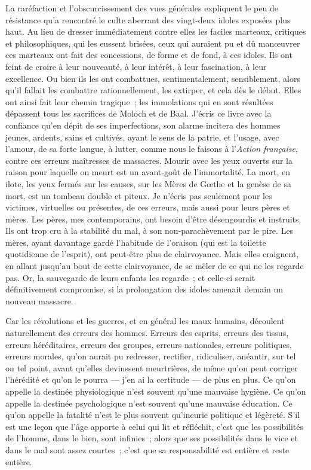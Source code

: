 \documentclass[french,twoside]{book} %
\begin{document}
La raréfaction et l’obscurcissement des vues générales expliquent le peu de résistance qu’a rencontré le culte aberrant des vingt-deux idoles exposées plus haut. Au lieu de dresser immédiatement contre elles les faciles marteaux, critiques et philosophiques, qui les eussent brisées, ceux qui auraient pu et dû manœuvrer ces marteaux ont fait des concessions, de forme et de fond, à ces idoles. Ils ont feint de croire à leur nouveauté, à leur intérêt, à leur fascination, à leur excellence. Ou bien ils les ont combattues, sentimentalement, sensiblement, alors qu’il fallait les combattre rationnellement, les extirper, et cela dès le début. Elles ont ainsi fait leur chemin tragique ; les immolations qui en sont résultées dépassent tous les sacrifices de Moloch et de Baal. J’écris ce livre avec la confiance qu’en dépit de ses imperfections, son alarme incitera des hommes jeunes, ardents, sains et cultivés, ayant le sens de la patrie, et l’usage, avec l’amour, de sa forte langue, à lutter, comme nous le faisons à l’{\itshape Action française}, contre ces erreurs maîtresses de massacres. Mourir avec les yeux ouverts sur la raison pour laquelle on meurt est un avant-goût de l’immortalité. La mort, en ilote, les yeux fermés sur les causes, sur les Mères de Gœthe et la genèse de sa mort, est un tombeau double et piteux. Je n’écris pas seulement pour les victimes, virtuelles ou présentes, de ces erreurs, mais aussi pour leurs pères et mères. Les pères, mes contemporains, ont besoin d’être désengourdis et instruits. Ils ont trop cru à la stabilité du mal, à son non-parachèvement par le pire. Les mères, ayant davantage gardé l’habitude de l’oraison (qui est la toilette quotidienne de l’esprit), ont peut-être plus de clairvoyance. Mais elles craignent, en allant jusqu’au bout de cette clairvoyance, de se mêler de ce qui ne les regarde pas. Or, la sauvegarde de leurs enfants les regarde ; et celle-ci serait définitivement compromise, si la prolongation des idoles amenait demain un nouveau massacre.\par
Car les révolutions et les guerres, et en général les maux humains, découlent naturellement des erreurs des hommes. Erreurs des esprits, erreurs des tissus, erreurs héréditaires, erreurs des groupes, erreurs nationales, erreurs politiques, erreurs morales, qu’on aurait pu redresser, rectifier, ridiculiser, anéantir, sur tel ou tel point, avant qu’elles devinssent meurtrières, de même qu’on peut corriger l’hérédité et qu’on le pourra — j’en ai la certitude — de plus en plus. Ce qu’on appelle la destinée physiologique n’est souvent qu’une mauvaise hygiène. Ce qu’on appelle la destinée psychologique n’est souvent qu’une mauvaise éducation. Ce qu’on appelle la fatalité n’est le plus souvent qu’incurie politique et légèreté. S’il est une leçon que l’âge apporte à celui qui lit et réfléchit, c’est que les possibilités de l’homme, dans le bien, sont infinies ; alors que ses possibilités dans le vice et dans le mal sont assez courtes ; c’est que sa responsabilité est entière et reste entière.\par
\end{document}
